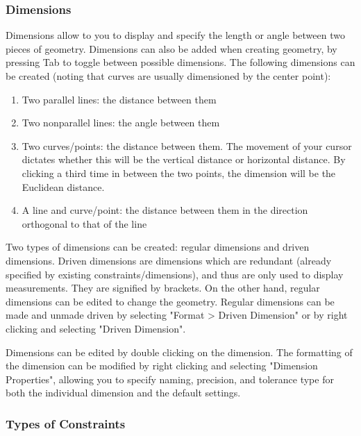 \subsubsection{Dimensions}
Dimensions allow to you to display and specify the length or angle between two pieces of geometry. Dimensions can also be added when creating geometry, by pressing Tab to toggle between possible dimensions. The following dimensions can be created (noting that curves are usually dimensioned by the center point):

\begin{enumerate}
\item Two parallel lines: the distance between them
\item Two nonparallel lines: the angle between them
\item Two curves/points: the distance between them. The movement of your cursor dictates whether this will be the vertical distance or horizontal distance. By clicking a third time in between the two points, the dimension will be the Euclidean distance.
\item A line and curve/point: the distance between them in the direction orthogonal to that of the line
\end{enumerate}

Two types of dimensions can be created: regular dimensions and driven dimensions. Driven dimensions are dimensions which are redundant (already specified by existing constraints/dimensions), and thus are only used to display measurements. They are signified by brackets. On the other hand, regular dimensions can be edited to change the geometry. Regular dimensions can be made and unmade driven by selecting "Format > Driven Dimension" or by right clicking and selecting "Driven Dimension".

Dimensions can be edited by double clicking on the dimension. The formatting of the dimension can be modified by right clicking and selecting "Dimension Properties", allowing you to specify naming, precision, and tolerance type for both the individual dimension and the default settings.


\subsubsection{Types of Constraints}


